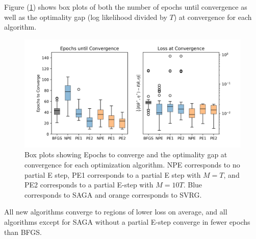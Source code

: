 Figure (\ref{fig:boxplots_case}) shows box plots of both the number of epochs until convergence as well as the optimality gap (log likelihood divided by $T$) at convergence for each algorithm.
%
\begin{figure}
    \centering
    \includegraphics[width=6.5in]{../plt/boxplots_case_study.png}
    \caption{Box plots showing Epochs to converge and the optimality gap at convergence for each optimization algorithm. NPE corresponds to no partial E step, PE1 corresponds to a partial E step with $M=T$, and PE2 corresponds to a partial E-step with $M=10T$. Blue corresponds to SAGA and orange corresponds to SVRG.}
    \label{fig:boxplots_case}
\end{figure}
%
All new algorithms converge to regions of lower loss on average, and all algorithms except for SAGA without a partial E-step converge in fewer epochs than BFGS.

